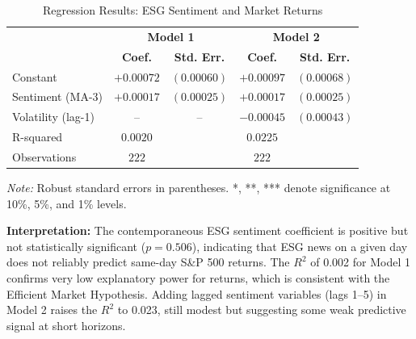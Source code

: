 \documentclass[12pt,a4paper]{article}
\begin{document}
\begin{table}[H]
    \centering
    \caption{Regression Results: ESG Sentiment and Market Returns}
    \label{tab:reg-returns}
    \begin{tabular}{lcccc}
        \toprule
        & \multicolumn{2}{c}{\textbf{Model 1}} & \multicolumn{2}{c}{\textbf{Model 2}} \\
        & \textbf{Coef.} & \textbf{Std. Err.} & \textbf{Coef.} & \textbf{Std. Err.} \\
        \midrule
        Constant & $+0.00072$ & $(0.00060)$ & $+0.00097$ & $(0.00068)$ \\
        Sentiment (MA-3) & $+0.00017$ & $(0.00025)$ & $+0.00017$ & $(0.00025)$ \\
        Volatility (lag-1) & -- & -- & $-0.00045$ & $(0.00043)$ \\
        \midrule
        R-squared & $0.0020$ & & $0.0225$ & \\
        Observations & $222$ & & $222$ & \\
        \bottomrule
    \end{tabular}
    \vspace{0.3cm}
    
    \small{\textit{Note:} Robust standard errors in parentheses. *, **, *** denote significance at 10\%, 5\%, and 1\% levels.}
\end{table}

\textbf{Interpretation:} The contemporaneous ESG sentiment coefficient is positive but not statistically significant ($p = 0.506$), indicating that ESG news on a given day does not reliably predict same-day S\&P 500 returns. The $R^2$ of 0.002 for Model 1 confirms very low explanatory power for returns, which is consistent with the Efficient Market Hypothesis. Adding lagged sentiment variables (lags 1--5) in Model 2 raises the $R^2$ to 0.023, still modest but suggesting some weak predictive signal at short horizons.
\label{subsubsec:rq1-volatility}
\end{document}
